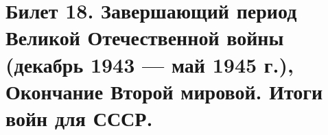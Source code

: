 \section{Билет 18. Завершающий период Великой Отечественной войны (декабрь 1943 — май 1945 г.), Окончание Второй мировой. Итоги войн для СССР.}